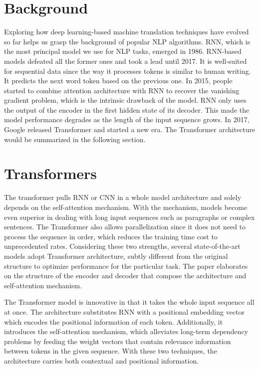\documentclass[letterpaper, 11pt]{article}
\begin{document}
\section{Background}
\label{sec:background}
Exploring how deep learning-based machine translation techniques have evolved so far helps us grasp the background of popular NLP algorithms. RNN, which is the most principal model we use for NLP tasks, emerged in 1986. RNN-based models \citep{DBLP:journals/corr/0001KYS17} defeated all the former ones and took a lead until 2017. It is well-suited for sequential data since the way it processes tokens is similar to human writing. It predicts the next word token based on the previous one. In 2015, people started to combine attention architecture \citep{bahdanau2014neural} with RNN to recover the vanishing gradient problem, which is the intrinsic drawback of the model. RNN only uses the output of the encoder in the first hidden state of its decoder. This made the model performance degrades as the length of the input sequence grows. In 2017, Google released Transformer and started a new era. The Transformer architecture would be summarized in the following section.


\section{Transformers}
\label{sec:Transformers} 
The transformer \citep{NIPS2017_3f5ee243} pulls RNN or CNN in a whole model architecture and solely depends on the self-attention mechanism. With the mechanism, models become even superior in dealing with long input sequences such as paragraphs or complex sentences. The Transformer also allows parallelization since it does not need to process the sequence in order, which reduces the training time cost to unprecedented rates. Considering these two strengths, several state-of-the-art models adopt Transformer architecture, subtly different from the original structure to optimize performance for the particular task. The paper elaborates on the structure of the encoder and decoder that compose the architecture and self-attention mechanism.

The Transformer model is innovative in that it takes the whole input sequence all at once. The architecture substitutes RNN with a positional embedding vector which encodes the positional information of each token. Additionally, it introduces the self-attention mechanism, which alleviates long-term dependency problems by feeding the weight vectors that contain relevance information between tokens in the given sequence. With these two techniques, the architecture carries both contextual and positional information. 
\end{document}
